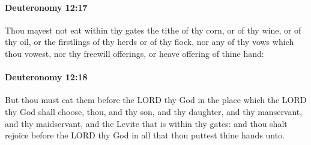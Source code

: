 		\paragraph{Deuteronomy 12:17} %
			\label{DEUTERONOMY-12-17}

			Thou mayest not eat within thy gates the tithe of thy corn, or of thy wine, or of thy oil, or the firstlings of thy herds or of thy flock, nor any of thy vows which thou vowest, nor thy freewill offerings, or heave offering of thine hand:


		\paragraph{Deuteronomy 12:18} %
			\label{DEUTERONOMY-12-18}

			But thou must eat them before the LORD thy God in the place which the LORD thy God shall choose, thou, and thy son, and thy daughter, and thy manservant, and thy maidservant, and the Levite that is within thy gates: and thou shalt rejoice before the LORD thy God in all that thou puttest thine hands unto.

